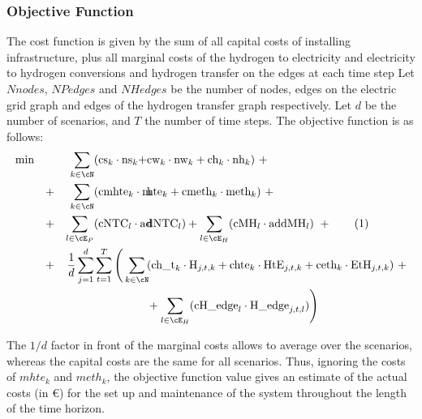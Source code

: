 \subsubsection{Objective Function}
The cost function is given by the sum of all capital costs of installing infrastructure, plus all marginal costs of the hydrogen to electricity and electricity to hydrogen conversions and hydrogen transfer on the edges at each time step
Let $Nnodes$, $NPedges$ and $NHedges$ be the number of nodes, edges on the electric grid graph and edges of the hydrogen transfer graph respectively. Let $d$ be the number of scenarios, and $T$ the number of time steps. The objective function is as follows:
\begin{align*}
    \min \quad 
    &&\sum_{k\in\cN}&(\text{cs}_k \cdot \text{ns}_k+\hspace{-1em}&&\text{cw}_k \cdot \text{nw}_k + \text{ch}_k \cdot \text{nh}_k )\ + \\
    &+& \sum_{k\in\cN}&(\text{cmhte}_k\cdot\text{m} \hspace{-2em}&& \text{hte}_k + \text{cmeth}_k\cdot \text{meth}_k) \ + \\
    &+& \sum_{l\in\cE_P}& (\text{cNTC}_l\cdot \text{ad}\hspace{-2em}&&\text{dNTC}_l) 
    + \sum_{l\in\cE_H} (\text{cMH}_l\cdot \text{addMH}_l) \ + \stepcounter{equation}\tag{\theequation}\label{objVal} \\   
    &+&\frac{1}{d}\sum_{j=1}^{d}&\sum_{t=1}^{T} \Bigg(\sum_{k\in\cN} \hspace{-5em}&&
    (\text{ch\_t}_k \cdot \text{H}_{j,t,k} + \text{chte}_k \cdot \text{HtE}_{j,t,k} + \text{ceth}_k \cdot \text{EtH}_{j,t,k})\ + \\
    &&&\hspace{-2em}&&+\sum_{l\in\cE_H} (\text{cH\_edge}_l\cdot\text{H\_edge}_{j,t,l}) \Bigg)
\end{align*}

The $1/d$ factor in front of the marginal costs allows to average over the scenarios, whereas the capital costs are the same for all scenarios. Thus, ignoring the costs of $mhte_k$ and $meth_k$, the objective function value gives an estimate of the actual costs (in \euro) for the set up and maintenance of the system throughout the length of the time horizon. 


